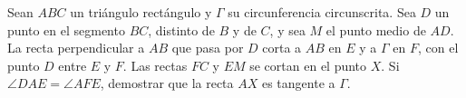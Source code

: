 Sean $ABC$ un triángulo rectángulo y $\Gamma$ su circunferencia circunscrita. Sea $D$ un punto en el segmento $BC$, distinto de $B$ y de $C$, y sea $M$ el punto medio de $AD$. La recta perpendicular a $AB$ que pasa por $D$ corta a $AB$ en $E$ y a $\Gamma$ en $F$, con el punto $D$ entre $E$ y $F$. Las rectas $FC$ y $EM$ se cortan en el punto $X$. Si $\angle DAE = \angle AFE$, demostrar que la recta $AX$ es tangente a $\Gamma$.
